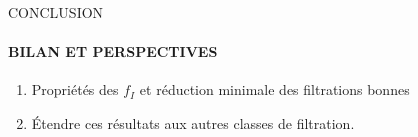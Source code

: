 \documentclass[11pt,a4paper]{beamer}
\begin{document}
\begin{frame}{CONCLUSION}
	\framesubtitle{BILAN ET PERSPECTIVES}
	\begin{block}{}	
		\begin{enumerate}
			\item Propriétés des $f_I$ et réduction minimale des filtrations bonnes
			\item Étendre ces résultats aux autres classes de filtration.
		\end{enumerate}
	\end{block}
\end{frame}

\end{document}
